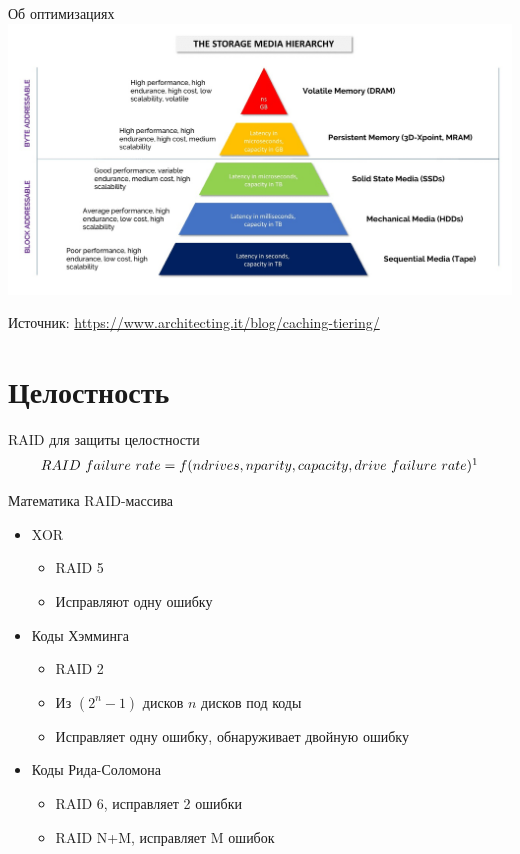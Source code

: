 \documentclass[aspectratio=169]{beamer}
\begin{document}
\begin{frame}{Об оптимизациях}
    \centering
    \includegraphics[scale=0.25]{fig/9.tiering.jpg}
    
    \tiny Источник: \url{https://www.architecting.it/blog/caching-tiering/}
\end{frame}

\section{Целостность}

\begin{frame}{RAID для защиты целостности}
\raid
\begin{align*}
    RAID\ failure\ rate = f(ndrives, nparity, capacity, drive\ failure\ rate)\footnotemark
\end{align*}
\end{frame}

\begin{frame}{Математика RAID-массива}
    \begin{itemize}
        \item XOR
        \begin{itemize}
            \item RAID 5
            \item Исправляют одну ошибку
        \end{itemize}
        \item Коды Хэмминга
        \begin{itemize}
            \item RAID 2
            \item Из $(2^n - 1)$ дисков $n$ дисков под коды
            \item Исправляет одну ошибку, обнаруживает двойную ошибку 
        \end{itemize}
        \item Коды Рида-Соломона
        \begin{itemize}
            \item RAID 6, исправляет 2 ошибки
            \item RAID N+M, исправляет M ошибок
        \end{itemize}
    \end{itemize}
\end{frame}
\end{document}
